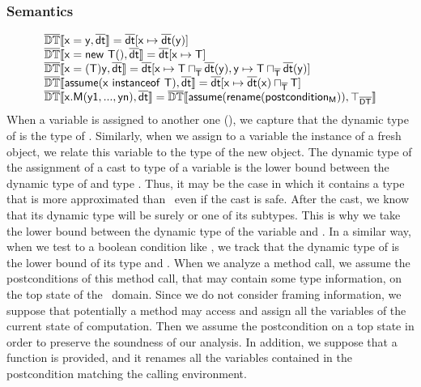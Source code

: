 \documentclass{llncs}
\begin{document}
\subsubsection{Semantics}
\[
\begin{array}{l}
\mathbb{\overline{\mathit{\mathbb{DT}}}}\llbracket \mathtt{\mathsf{x=y}, \mathsf{\overline{dt}}} \rrbracket=\mathsf{\overline{dt}}[\mathsf{x} \mapsto \mathsf{\overline{dt}}(\mathsf{y})]\\
\mathbb{\overline{\mathit{\mathbb{DT}}}}\llbracket \mathtt{\mathsf{x=new\ T()}, \mathsf{\overline{dt}}} \rrbracket=\mathsf{\overline{dt}}[\mathsf{x} \mapsto \mathsf{T}]\\
\mathbb{\overline{\mathit{\mathbb{DT}}}}\llbracket \mathtt{\mathsf{x=(T) y}, \mathsf{\overline{dt}}} \rrbracket=\mathsf{\overline{dt}}[\mathsf{x} \mapsto \mathsf{T} \sqcap_{\mathsf{\overline{T}}} \mathsf{\overline{dt}}(\mathsf{y}), \mathsf{y} \mapsto \mathsf{T} \sqcap_{\mathsf{\overline{T}}} \mathsf{\overline{dt}}(\mathsf{y})]\\
\mathbb{\overline{\mathit{\mathbb{DT}}}}\llbracket \mathtt{\mathsf{assume(x\ instanceof\ T)}, \mathsf{\overline{dt}}} \rrbracket=\mathsf{\overline{dt}}[\mathsf{x} \mapsto \mathsf{\overline{dt}}(\mathsf{x}) \sqcap_{\mathsf{\overline{T}}} \mathsf{T}]\\
\mathbb{\overline{\mathit{\mathbb{DT}}}}\llbracket \mathtt{\mathsf{x.M(y1, ..., yn)}, \mathsf{\overline{dt}}} \rrbracket=\mathbb{\overline{\mathit{\mathbb{DT}}}}\llbracket \mathtt{\mathsf{assume(rename(postcondition_M))}, \top_{\mathsf{\overline{DT}}}} \rrbracket\\
\end{array}
\]
When a variable is assigned to another one (), we capture that the dynamic type of  is the type of . Similarly, when we assign to a variable the instance of a fresh object, we relate this variable to the type of the new object. The dynamic type of the assignment of a cast to type  of a variable  is the lower bound between the dynamic type of  and type . Thus, it may be the case in which it contains a type that is more approximated than \ even if the cast is safe. After the cast, we know that its dynamic type will be surely  or one of its subtypes. This is why we take the lower bound between the dynamic type of the variable and .  In a similar way, when we test to  a boolean condition like , we track that the dynamic type of  is the lower bound of its type and . When we analyze a method call, we assume the postconditions of this method call, that may contain some type information, on the top state of the \dynamictype\ domain. Since we do not consider framing information, we suppose that potentially a method may access and assign all the variables of the current state of computation. Then we assume the postcondition on a top state in order to preserve the soundness of our analysis. In addition, we suppose that a  function is provided, and it renames all the variables contained in the postcondition matching the calling environment.
\end{document}
